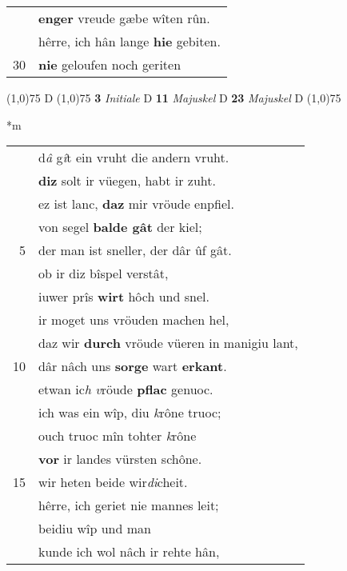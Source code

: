 \documentclass[8pt,a4paper,notitlepage]{article}
\begin{document}
\begin{table}[ht]
\begin{minipage}[t]{0.5\linewidth}
\begin{tabular}{rl}
 & \textbf{enger} vreude gæbe wîten rûn.\\ 
 & hêrre, ich hân lange \textbf{hie} gebiten.\\ 
30 & \textbf{nie} geloufen noch geriten\\ 
\end{tabular}
\scriptsize
\line(1,0){75} \newline
D \newline
\line(1,0){75} \newline
\textbf{3} \textit{Initiale} D  \textbf{11} \textit{Majuskel} D  \textbf{23} \textit{Majuskel} D  \newline
\line(1,0){75} \newline
\newline
\end{minipage}
\hspace{0.5cm}
\begin{minipage}[t]{0.5\linewidth}
\small
\begin{center}*m
\end{center}
\begin{tabular}{rl}
 & d\textit{â} g\textit{î}t ein vruht die andern vruht.\\ 
 & \textbf{diz} solt ir vüegen, habt ir zuht.\\ 
 & ez ist lanc, \textbf{daz} mir vröude enpfiel.\\ 
 & von segel \textbf{balde gât} der kiel;\\ 
5 & der man ist sneller, der dâr ûf gât.\\ 
 & ob ir diz bîspel verstât,\\ 
 & iuwer prîs \textbf{wirt} hôch und snel.\\ 
 & ir moget uns vröuden machen hel,\\ 
 & daz wir \textbf{durch} vröude vüeren in manigiu lant,\\ 
10 & dâr nâch uns \textbf{sorge} wart \textbf{erkant}.\\ 
 & etwan ic\textit{h} \textit{v}röude \textbf{pflac} genuoc.\\ 
 & ich was ein wîp, diu \textit{k}rône truoc;\\ 
 & ouch truoc mîn tohter \textit{k}rône\\ 
 & \textbf{vor} ir landes vürsten schône.\\ 
15 & wir heten beide wir\textit{di}cheit.\\ 
 & hêrre, ich geriet nie mannes leit;\\ 
 & beidiu wîp und man\\ 
 & kunde ich wol nâch ir rehte hân,\\ 

\end{tabular}
\end{minipage}
\end{table}
\end{document}
